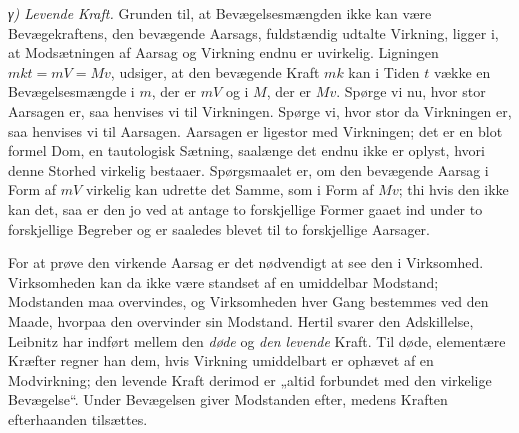 \documentclass[12pt,a4paper]{book}
\newcommand{\subrunin}[1]{\emph{#1}\hspace{0.4em}}
\begin{document}
\subrunin{γ) Levende Kraft.} Grunden til, at Bevægelsesmængden ikke kan
være Bevægekraftens, den bevægende Aarsags, fuldstændig udtalte Virkning,
ligger i, at Modsætningen af Aarsag og Virkning endnu er uvirkelig.
Ligningen $mkt = mV = Mv$, udsiger, at den bevægende Kraft $mk$ kan i
Tiden $t$ vække en Bevægelsesmængde i $m$, der er $mV$ og i $M$, der er
$Mv$. Spørge vi nu, hvor stor Aarsagen er, saa henvises vi til
Virkningen. Spørge vi, hvor stor da Virkningen er, saa henvises vi til
Aarsagen. Aarsagen er ligestor med Virkningen; det er en blot formel Dom,
en tautologisk Sætning, saalænge det endnu ikke er oplyst,
hvori denne Storhed virkelig bestaaer. Spørgsmaalet er, om den bevægende
Aarsag i Form af $mV$ virkelig kan udrette det Samme, som i Form af $Mv$;
thi hvis den ikke kan det, saa er den jo ved at antage to forskjellige
Former gaaet ind under to forskjellige Begreber og er saaledes blevet til
to forskjellige Aarsager.

For at prøve den virkende Aarsag er det nødvendigt at see den i
Virksomhed. Virksomheden kan da ikke være standset af en umiddelbar
Modstand; Modstanden maa overvindes, og Virksomheden hver Gang bestemmes
ved den Maade, hvorpaa den overvinder sin Modstand. Hertil svarer den
Adskillelse, Leibnitz har indført mellem den
\emph{døde} og \emph{den levende} Kraft. Til døde, elementære Kræfter
regner han dem, hvis Virkning umiddelbart er ophævet af en Modvirkning;
den levende Kraft derimod er „altid forbundet med den virkelige
Bevægelse“. Under Bevægelsen giver Modstanden efter, medens Kraften
efterhaanden tilsættes.
\end{document}
